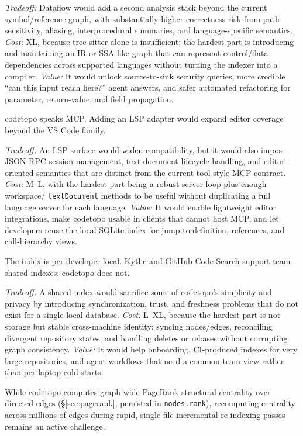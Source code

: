 \begin{description}
        \emph{Tradeoff:} Dataflow would add a second analysis stack beyond the
        current symbol/reference graph, with substantially higher correctness
        risk from path sensitivity, aliasing, interprocedural summaries, and
        language-specific semantics. \emph{Cost:} XL, because tree-sitter alone
        is insufficient; the hardest part is introducing and maintaining an IR
        or SSA-like graph that can represent control/data dependencies across
        supported languages without turning the indexer into a compiler.
        \emph{Value:} It would unlock source-to-sink security queries, more
        credible ``can this input reach here?'' agent answers, and safer
        automated refactoring for parameter, return-value, and field propagation.
  \item[No formal LSP endpoint.] codetopo speaks MCP. Adding an LSP adapter
        would expand editor coverage beyond the VS Code family.

        \emph{Tradeoff:} An LSP surface would widen compatibility, but it would
        also impose JSON-RPC session management, text-document lifecycle
        handling, and editor-oriented semantics that are distinct from the
        current tool-style MCP contract. \emph{Cost:} M--L, with the hardest
        part being a robust server loop plus enough workspace/\allowbreak
        \texttt{textDocument} methods to be useful without duplicating a full
        language server for each language. \emph{Value:} It would enable
        lightweight editor integrations, make codetopo usable in clients that
        cannot host MCP, and let developers reuse the local SQLite index for
        jump-to-definition, references, and call-hierarchy views.
  \item[No remote/shared index.] The index is per-developer local. Kythe and
        GitHub Code Search support team-shared indexes; codetopo does not.

        \emph{Tradeoff:} A shared index would sacrifice some of codetopo's
        simplicity and privacy by introducing synchronization, trust, and
        freshness problems that do not exist for a single local database.
        \emph{Cost:} L--XL, because the hardest part is not storage but stable
        cross-machine identity: syncing nodes/edges, reconciling divergent
        repository states, and handling deletes or rebases without corrupting
        graph consistency. \emph{Value:} It would help onboarding, CI-produced
        indexes for very large repositories, and agent workflows that need a
        common team view rather than per-laptop cold starts.
  \item[Incremental centrality maintenance.] While codetopo computes graph-wide
        PageRank structural centrality over directed edges (\S\ref{sec:pagerank},
        persisted in \texttt{nodes.rank}), recomputing centrality across millions
        of edges during rapid, single-file incremental re-indexing passes remains
        an active challenge.


\end{description}
